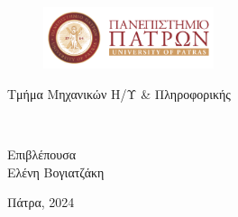 \begin{titlepage}
    \centering

    \begin{figure}[H]
        \centering
        \includegraphics[width=5cm,alt={Λογότυπο Πανεπιστημίου Πατρών}]{images/logo_upatras}
        \label{fig:logo_upatras}
    \end{figure}
    Τμήμα Μηχανικών Η/Υ \& Πληροφορικής
    
    \vspace{4cm}
    
    {\Huge\textbf{\thesistitle}}
    
    \vspace{3cm}
    
    {\large \thesisauthor\\[2pt]}
    {\small \thesisauthorid}
    
    \vspace{1.5cm}
    
    {\small Επιβλέπουσα\\[2pt]}
    Ελένη Βογιατζάκη
    
    \vfill
    
    Πάτρα, 2024
\end{titlepage}
